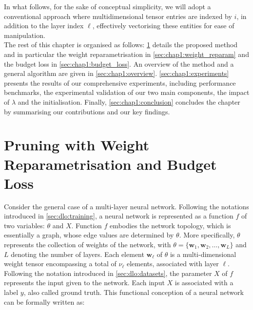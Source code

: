 In what follows, for the sake of conceptual simplicity, we will adopt a
conventional approach where multidimensional tensor entries are indexed by $i$,
in addition to the layer index $\ell$, effectively vectorising these entities
for ease of manipulation. \\

The rest of this chapter is organised as follows: \cref{sec:chap1:pruning}
details the proposed method and in particular the weight reparametrisation in
\cref{sec:chap1:weight_reparam} and the budget loss in
\cref{sec:chap1:budget_loss}. An overview of the method and a general algorithm
are given in \cref{sec:chap1:overview}. \cref{sec:chap1:experiments} presents
the results of our comprehensive experiments, including performance benchmarks,
the experimental validation of our two main components, the impact of $\lambda$
and the initialisation. Finally, \cref{sec:chap1:conclusion} concludes the
chapter by summarising our contributions and our key findings.\\





\section{Pruning with Weight Reparametrisation and Budget Loss}\label{sec:chap1:pruning}
Consider the general case of a multi-layer neural network. Following the
notations introduced in \cref{sec:dlo:training}, a neural network is represented
as a function $f$ of two variables: $\theta$ and $X$. Function $f$ embodies the
network topology, which is essentially a graph, whose edge values are
determined by $\theta$. More specifically, $\theta$ represents the collection of
weights of the network, with $\theta = \{\mathbf{w}_1, \mathbf{w}_2, \ldots,
\mathbf{w}_L\}$ and $L$ denoting the number of layers. Each element
$\mathbf{w}_\ell$ of $\theta$ is a multi-dimensional weight tensor encompassing
a total of $\nu_\ell$ elements, associated with layer $\ell$. Following the
notation introduced in \cref{sec:dlo:datasets}, the parameter $X$ of $f$
represents the input given to the network. Each input $X$ is associated with a
label $y$, also called ground truth. This functional conception of a neural
network can be formally written as:\\


